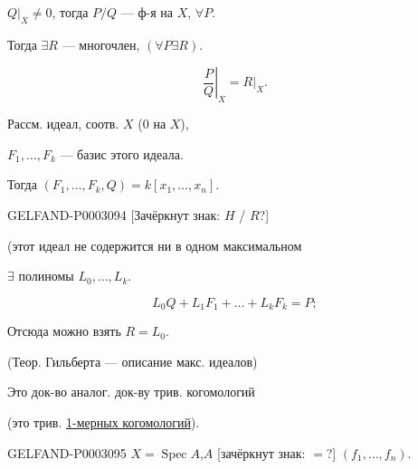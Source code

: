 $Q|_X\ne0$, тогда $P/Q$ --- ф-я на $X$, $\forall P$.





Тогда $\exists R$ --- многочлен, $(\forall P\exists R)$.

\begin{equation*}\left.\frac P Q\right|_X=R|_X.\end{equation*}

Рассм. идеал, соотв. $X$ (0 на $X$),

$F_1,\ldots,F_k$ --- базис этого идеала.

Тогда $(F_1,\ldots,F_k,Q)=k[x_1,\ldots,x_n]$.





\begin{GelfandAdjacentEvidence}{GELFAND-P000309}{4}
[Зачёркнут знак: $H$ / $R$?]

\end{GelfandAdjacentEvidence}


(этот идеал не содержится ни в одном максимальном

$\exists$ полиномы $L_0,\ldots,L_k$.

\begin{equation*}L_0Q+L_1F_1+\ldots+L_kF_k=P;\end{equation*}





Отсюда можно взять $R=L_0$.

(Теор. Гильберта --- описание макс. идеалов)

Это док-во аналог. док-ву трив. когомологий

(это трив. \underline{1-мерных когомологий}).

\begin{GelfandAdjacentEvidence}{GELFAND-P000309}{5}
$X=\operatorname{Spec}A$,\quad $A$ [зачёркнут знак: $=$?] $(f_1,\ldots,f_n)$.

\end{GelfandAdjacentEvidence}


